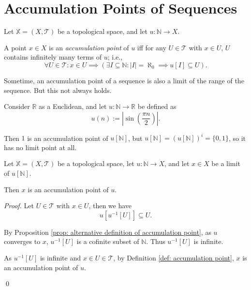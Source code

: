 \section{Accumulation Points of Sequences}


\begin{definition}
	\label{def: accumulation point}
	Let $\mathbb X = (X, \mathcal T)$ be a topological space, and let $u: \mathbb N \to X$.
	
	A point $x \in X$ is an \textit{accumulation point} of $u$ iff for any $U \in \mathcal T$ with $x \in U$, $U$ contains infinitely many terms of $u$; i.e.,
	$$
	\forall U \in \mathcal T : x \in U \implies (\exists I \subseteq \mathbb N : |I| = \aleph_0 \implies u[I] \subseteq U).
	$$
\end{definition}


\begin{note}
	Sometime, an accumulation point of a sequence is also a limit of the range of the sequence. But this not always holds.
	
	Consider $\mathbb R$ as a Euclidean, and let $u: \mathbb N \to \mathbb R$ be defined as
	$$
	u(n) := \left| \sin \left( \frac{\pi n}{2} \right) \right|.
	$$
	
	Then $1$ is an accumulation point of $u[\mathbb N]$, but $u[\mathbb N] = (u[\mathbb N])^i = \{0,1\}$, so it has no limit point at all.
\end{note}


\begin{proposition}
	Let $\mathbb X = (X, \mathcal T)$ be a topological space, let $u: \mathbb N \to X$, and let $x \in X$ be a limit of $u[\mathbb N]$.
	
	Then $x$ is an accumulation point of $u$.
	
	\begin{proof}
		Let $U \in \mathcal T$ with $x \in U$, then we have		
		$$
		u [u^{-1}[U]] \subseteq U.
		$$
		
		By Proposition \ref{prop: alternative definition of accumulation point}, as $u$ converges to $x$, $u^{-1}[U]$ is a cofinite subset of $\mathbb N$. Thus $u^{-1}[U]$ is infinite.
		
		As $u^{-1}[U]$ is infinite and $x \in U \in \mathcal T$, by Definition \ref{def: accumulation point}, $x$ is an accumulation point of $u$.
		
		\qed
	\end{proof}
\end{proposition}


